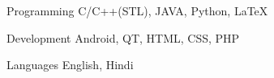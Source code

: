 


\begin{cvskills}


\cvskill
{Programming} %
{C/C++(STL), JAVA, Python, LaTeX} %


\cvskill
{Development} %
{ Android, QT, HTML, CSS, PHP} %


\cvskill
{Languages} %
{English, Hindi} %




\end{cvskills}